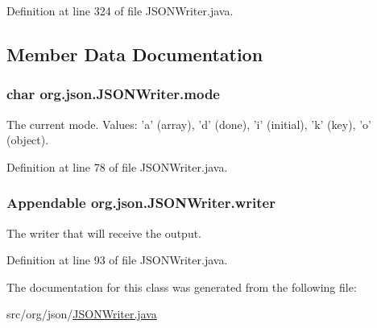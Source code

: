 Definition at line 324 of file J\-S\-O\-N\-Writer.\-java.



\subsection{Member Data Documentation}
\hypertarget{classorg_1_1json_1_1JSONWriter_acabe6b245b148eabfaa3cf975f98073f}{
\subsubsection[{mode}]{\setlength{\rightskip}{0pt plus 5cm}char org.\-json.\-J\-S\-O\-N\-Writer.\-mode\hspace{0.3cm}{\ttfamily [protected]}}}\label{classorg_1_1json_1_1JSONWriter_acabe6b245b148eabfaa3cf975f98073f}
The current mode. Values\-: 'a' (array), 'd' (done), 'i' (initial), 'k' (key), 'o' (object). 

Definition at line 78 of file J\-S\-O\-N\-Writer.\-java.

\hypertarget{classorg_1_1json_1_1JSONWriter_aa90b49b9c27c56b9d9c72186517b83c6}{
\subsubsection[{writer}]{\setlength{\rightskip}{0pt plus 5cm}Appendable org.\-json.\-J\-S\-O\-N\-Writer.\-writer\hspace{0.3cm}{\ttfamily [protected]}}}\label{classorg_1_1json_1_1JSONWriter_aa90b49b9c27c56b9d9c72186517b83c6}
The writer that will receive the output. 

Definition at line 93 of file J\-S\-O\-N\-Writer.\-java.



The documentation for this class was generated from the following file\-:\begin{DoxyCompactItemize}
\item 
src/org/json/\hyperlink{JSONWriter_8java}{J\-S\-O\-N\-Writer.\-java}\end{DoxyCompactItemize}
